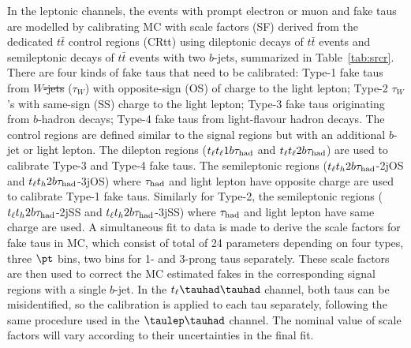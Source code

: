 \documentclass[PAPER, coverpage, atlasdraft=true, texlive=2016, UKenglish]{\ATLASLATEXPATH atlasdoc}
\providecommand{\DIFadd}[1]{{\protect\color{blue}\uwave{#1}}} %
\providecommand{\DIFdel}[1]{{\protect\color{red}\sout{#1}}}                      %
\providecommand{\DIFaddbegin}{} %
\providecommand{\DIFaddend}{} %
\providecommand{\DIFdelbegin}{} %
\providecommand{\DIFdelend}{} %
\begin{document}
In the leptonic channels, the events with prompt electron or muon and fake taus are modelled by calibrating MC with scale factors (SF)
derived from the dedicated $t\bar t$
control regions (CRtt) using dileptonic decays of $t\bar t$ events and semileptonic decays of $t\bar t$ events with two
$b$-jets, summarized in Table~\ref{tab:srcr}. 	
There are four kinds of fake taus that need to be calibrated: Type-1 fake taus from \DIFdelbegin \DIFdel{$W$-jets }\DIFdelend \DIFaddbegin \DIFadd{hadronically-decaying W-bosons }\DIFaddend ($\tau_{W}$) %
with opposite-sign (OS) of charge to the light lepton;
Type-2 $\tau_{W}$'s with same-sign (SS) charge to the light lepton; Type-3 fake taus originating from $b$-hadron decays; Type-4 fake taus from light-flavour hadron decays.
The control regions are defined similar to the signal regions but with an additional $b$-jet or light lepton.
The dilepton regions ($t_{\ell}t_{\ell}1b\tau_\text{had}$ and $t_{\ell}t_{\ell}2b\tau_\text{had}$) are used to calibrate Type-3 and Type-4 fake taus. The semileptonic
regions ($t_{\ell}t_h2b\tau_\text{had}$-2jOS and $t_{\ell}t_h2b\tau_\text{had}$-3jOS) where $\tau_\text{had}$ and light lepton have opposite charge are used to calibrate Type-1 fake taus.
Similarly for Type-2, the semileptonic regions ($t_{\ell}t_h2b\tau_\text{had}$-2jSS and $t_{\ell}t_h2b\tau_\text{had}$-3jSS) where $\tau_\text{had}$ and light lepton have same charge are used.
A simultaneous fit to data is made to derive the scale factors for fake taus in MC, which consist of total of 24 parameters
depending on four types, three $\pt$ bins, two bins for 1- and 3-prong taus separately.
These scale factors are then used to correct the MC estimated fakes in the corresponding  signal regions with a single $b$-jet.
In the $t_{\ell}\thadhad$ channel, both taus can be misidentified, so the calibration is applied to each tau separately, following the same procedure used in the $\tlhad$ channel.
The nominal value of scale factors will vary according to their uncertainties in the final fit.
\end{document}
